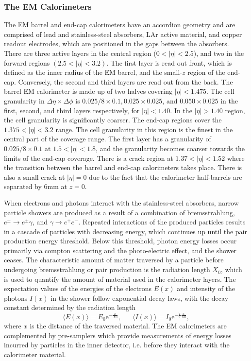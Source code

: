 \subsubsection{The EM Calorimeters}
The EM barrel and end-cap calorimeters have an accordion geometry and are comprised of lead and stainless-steel absorbers, LAr active material, and copper readout electrodes, which are positioned in the gaps between the absorbers. There are three active layers in the central region ($0 < |\eta| < 2.5$), and two in the forward regions $(2.5 < |\eta| < 3.2)$. The first layer is read out front, which is defined as the inner radius of the EM barrel, and the small-$z$ region of the end-cap. Conversely, the second and third layers are read out from the back. The barrel EM calorimeter is made up of two halves covering $|\eta|<1.475$. The cell granularity in $\Delta\eta\times\Delta\phi$ is $0.025/8\times0.1, 0.025\times0.025$, and $0.050\times0.025$ in the first, second, and third layers respectively, for $|\eta|<1.40$. In the $|\eta|>1.40$ region, the cell granularity is significantly coarser. The end-cap regions cover the $1.375<|\eta|<3.2$ range. The cell granularity in this region is the finest in the central part of the coverage range. The first layer has a granularity of $0.025/8\times0.1$ at $1.5<|\eta|<1.8$, and the granularity becomes coarser towards the limits of the end-cap coverage.  There is a crack region at $1.37<|\eta|<1.52$ where the transition between the barrel and end-cap calorimeters takes place. There is also a small crack at $|\eta|=0$ due to the fact that the calorimeter half-barrels are separated by 6mm at $z=0$.

When electrons and photons interact with the stainless-steel absorbers, narrow particle showers are produced as a result of a combination of bremsstrahlung, $e^{\pm}\rightarrow e^{\pm}\gamma$, and $\gamma\rightarrow e^+e^-$. Repeated interactions of the produced particles results in a cascade of particles with decreasing energy, which continues up until the pair production energy threshold. Below this threshold, photon energy losses occur primarily via compton scattering and the photo-electric effect, and the shower ceases. The characteristic amount of matter traversed by a particle before undergoing bremsstrahlung or pair production is the radiation length $X_0$, which is used to quantify the amount of material used in the calorimeter layers. The expectation values of the energies of the electrons $E(x)$ and intensity of the photons $I(x)$ in the shower follow exponential decay laws, with the decay constant determined by the radiation length
\begin{equation}
    \langle E(x)\rangle = E_0\mathrm{e}^{-\frac{x}{X0}},\hspace{20pt} \langle I(x)\rangle = I_0\mathrm{e}^{-\frac{7}{9}\frac{x}{X0}},
\end{equation}
where $x$ is the distance of the traversed material.
The EM calorimeters are complemented by pre-samplers which provide measurements of energy losses incurred by particles in the inner detector, i.e. before they interact with the calorimeter material.

